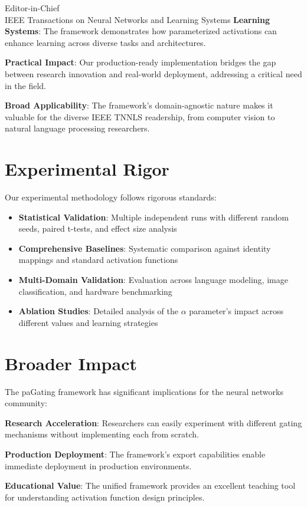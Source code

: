 \documentclass[11pt]{letter}
\begin{document}
\begin{letter}{Editor-in-Chief\\
IEEE Transactions on Neural Networks and Learning Systems}
\textbf{Learning Systems}: The framework demonstrates how parameterized activations can enhance learning across diverse tasks and architectures.

\textbf{Practical Impact}: Our production-ready implementation bridges the gap between research innovation and real-world deployment, addressing a critical need in the field.

\textbf{Broad Applicability}: The framework's domain-agnostic nature makes it valuable for the diverse IEEE TNNLS readership, from computer vision to natural language processing researchers.

\section*{Experimental Rigor}

Our experimental methodology follows rigorous standards:

\begin{itemize}
    \item \textbf{Statistical Validation}: Multiple independent runs with different random seeds, paired t-tests, and effect size analysis
    \item \textbf{Comprehensive Baselines}: Systematic comparison against identity mappings and standard activation functions
    \item \textbf{Multi-Domain Validation}: Evaluation across language modeling, image classification, and hardware benchmarking
    \item \textbf{Ablation Studies}: Detailed analysis of the $\alpha$ parameter's impact across different values and learning strategies
\end{itemize}

\section*{Broader Impact}

The paGating framework has significant implications for the neural networks community:

\textbf{Research Acceleration}: Researchers can easily experiment with different gating mechanisms without implementing each from scratch.

\textbf{Production Deployment}: The framework's export capabilities enable immediate deployment in production environments.

\textbf{Educational Value}: The unified framework provides an excellent teaching tool for understanding activation function design principles.


\end{letter}
\end{document}

